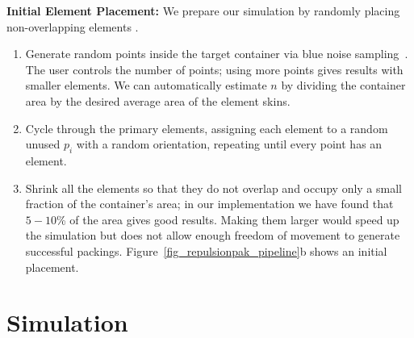 \textbf{Initial Element Placement:}
We prepare our simulation by randomly placing non-overlapping elements 
.
\begin{enumerate}
	\item Generate random points 
		  inside the target container 
	      via blue noise sampling~\cite{Bridson2007}.
	      The user controls the number of points; using more points gives results
	      with smaller elements.  We can automatically estimate $n$ by
		  dividing the container area by the desired average area of the element skins.
	\item Cycle through the primary elements, assigning each element to a 
		  random unused $p_i$ with a random orientation, repeating until 
		  every point has an element.
	\item Shrink all the elements so that they do not overlap and occupy only
		  a small fraction of the container's area; in our implementation we
		  have found that $5-10$\% of the area gives good results. Making them
		  larger would speed up the simulation but does
	      not allow enough freedom of movement to generate successful
		  packings.  Figure~\ref{fig_repulsionpak_pipeline}b shows an initial placement.	      
\end{enumerate}


\section{Simulation}
\label{repulsionpak_simulation}


